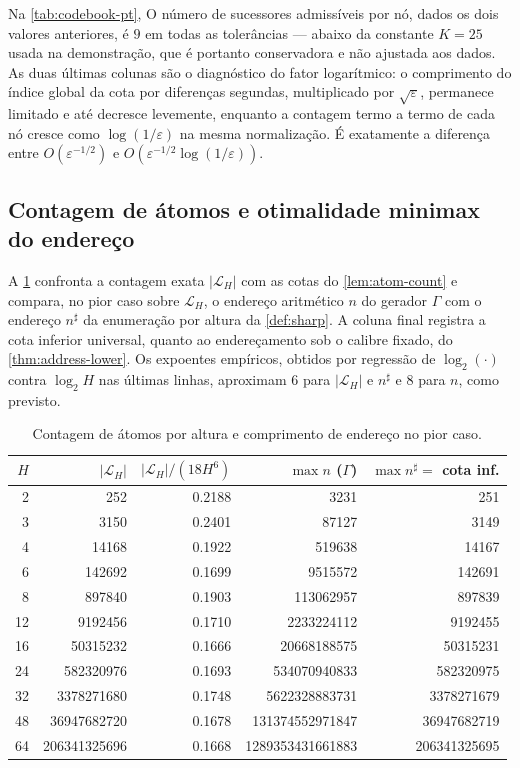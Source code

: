 \documentclass[11pt,a4paper]{article}
\theoremstyle{definition}
\theoremstyle{remark}
\newcommand{\Library}{\mathcal{L}}
\begin{document}
Na \cref{tab:codebook-pt}, O número de sucessores
admissíveis por nó, dados os dois valores anteriores, é $9$ em todas as
tolerâncias --- abaixo da constante $K=25$ usada na demonstração, que é
portanto conservadora e não ajustada aos dados. As duas últimas colunas são o
diagnóstico do fator logarítmico: o comprimento do índice global da cota por diferenças segundas,
multiplicado por $\sqrt{\varepsilon}$, permanece limitado e até decresce
levemente, enquanto a contagem termo a termo de cada nó cresce
como $\log(1/\varepsilon)$ na mesma normalização. É exatamente a diferença
entre $O(\varepsilon^{-1/2})$ e $O(\varepsilon^{-1/2}\log(1/\varepsilon))$.


\subsection{Contagem de átomos e otimalidade minimax do endereço}

A \cref{tab:enderecos-pt} confronta a contagem exata $|\Library_H|$ com as cotas do
\cref{lem:atom-count} e compara, no pior caso sobre $\Library_H$, o endereço
aritmético $n$ do gerador $\Gamma$ com o endereço $n^\sharp$ da enumeração por
altura da \cref{def:sharp}. A coluna final registra a cota inferior universal,
quanto ao endereçamento sob o calibre fixado, do
\cref{thm:address-lower}. Os expoentes empíricos, obtidos por regressão de
$\log_2(\cdot)$ contra $\log_2H$ nas últimas linhas, aproximam $6$ para
$|\Library_H|$ e $n^\sharp$ e $8$ para $n$, como previsto.

\begin{table}[t]
\centering
\caption{Contagem de átomos por altura e comprimento de endereço no pior caso.}
\label{tab:enderecos-pt}
\small
\begin{tabular}{rrrrr}
\toprule
$H$ & $|\Library_H|$ & $|\Library_H|/(18H^6)$ & $\max n$ ($\Gamma$) & $\max n^\sharp=$ cota inf.\\
\midrule
2 & 252 & 0.2188 & 3231 & 251\\
3 & 3150 & 0.2401 & 87127 & 3149\\
4 & 14168 & 0.1922 & 519638 & 14167\\
6 & 142692 & 0.1699 & 9515572 & 142691\\
8 & 897840 & 0.1903 & 113062957 & 897839\\
12 & 9192456 & 0.1710 & 2233224112 & 9192455\\
16 & 50315232 & 0.1666 & 20668188575 & 50315231\\
24 & 582320976 & 0.1693 & 534070940833 & 582320975\\
32 & 3378271680 & 0.1748 & 5622328883731 & 3378271679\\
48 & 36947682720 & 0.1678 & 131374552971847 & 36947682719\\
64 & 206341325696 & 0.1668 & 1289353431661883 & 206341325695\\
\bottomrule
\end{tabular}

\end{table}
\end{document}
